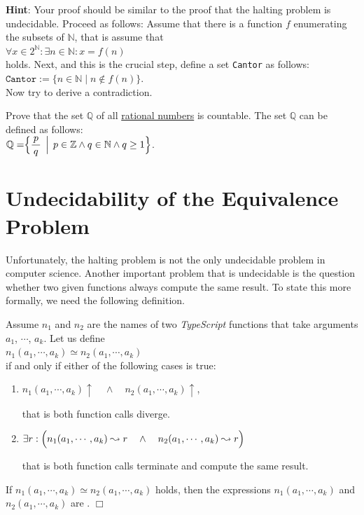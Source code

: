 \noindent
\textbf{Hint}:  Your proof should be similar to the proof that the halting problem is undecidable.
Proceed as follows:
Assume that there is a function $f$ enumerating the subsets of $\mathbb{N}$, that is assume that 
\\[0.2cm]
\hspace*{1.3cm}
$\forall x \in 2^\mathbb{N}: \exists n \in \mathbb{N}: x = f(n)$
\\[0.2cm]
holds.
Next, and this is the crucial step, define a set \texttt{Cantor} as follows:
\\[0.2cm]
\hspace*{1.3cm} $\mathtt{Cantor} := \bigl\{ n \in \mathbb{N} \mid n \notin f(n) \bigr\}$.
\\[0.2cm]
Now try to derive a contradiction.  \eox

\exerciseEng
Prove that the set $\mathbb{Q}$ of all \href{https://en.wikipedia.org/wiki/Rational_number}{rational numbers}
is countable.
The set $\mathbb{Q}$ can be defined as follows: 
\\[0.2cm]
\hspace*{1.3cm}
$\displaystyle \mathbb{Q} = \Bigr\{ \frac{\,p\,}{q} \,\Bigm|\, p \in \mathbb{Z} \wedge q \in \mathbb{N} \wedge q
\geq 1 \Bigr\}$.

\section[The Equivalence Problem]{Undecidability of the Equivalence Problem}
Unfortunately, the halting problem is not the only undecidable problem in computer science.
Another
important problem that is undecidable is the question whether two given functions always compute the
same result.
To state this more formally, we need the following definition.
\begin{Definition}[$\simeq$] 
Assume $n_1$ and $n_2$ are the names of two \textsl{TypeScript} functions that take arguments
  $a_1$, $\cdots$, $a_k$.
Let us define \\[0.2cm]
\hspace*{1.3cm} 
$n_1(a_1,\cdots,a_k) \simeq n_2(a_1,\cdots,a_k)$ 
\\[0.2cm]
if and only if either of the following cases is true:
\begin{enumerate}
\item $n_1(a_1,\cdots,a_k)\uparrow \quad\wedge\quad n_2(a_1,\cdots,a_k)\uparrow$,

      that is both function calls diverge.
\item $\exists r: \Bigl(n_1(a_1,\cdots,a_k) \leadsto r \quad\wedge\quad n_2(a_1,\cdots,a_k) \leadsto
  r\Bigr)$

      that is both function calls terminate and compute the same result.
\end{enumerate}
If $n_1(a_1,\cdots,a_k) \simeq n_2(a_1,\cdots,a_k)$ holds, then the expressions $n_1(a_1,\cdots,a_k)$ and $n_2(a_1,\cdots,a_k)$ are 
.
\hspace*{\fill} $\Box$
\end{Definition}

